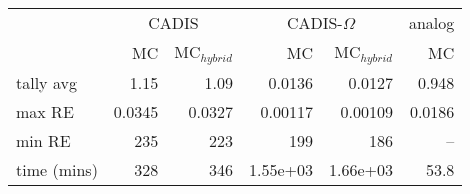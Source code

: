 \begin{tabular}{lrrrrr}
\toprule
{} & \multicolumn{2}{c}{CADIS}   & \multicolumn{2}{c}{CADIS-$\Omega$}  & analog \\
{} &    MC & MC$_{hybrid}$ &         MC & MC$_{hybrid}$ &     MC \\
\midrule
tally avg   &   1.15 &        1.09 &     0.0136 &      0.0127 &  0.948 \\
max RE      & 0.0345 &      0.0327 &    0.00117 &     0.00109 & 0.0186 \\
min RE      &    235 &         223 &        199 &         186 &    -- \\
time (mins) &    328 &         346 &   1.55e+03 &    1.66e+03 &   53.8 \\
\bottomrule
\end{tabular}
